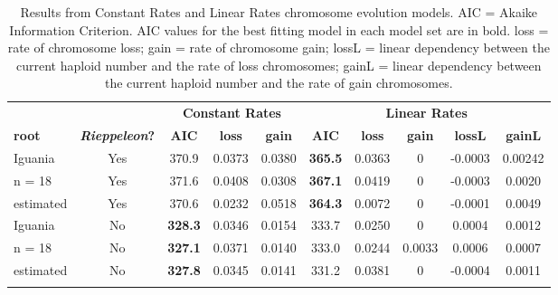 \begin{longtable}{lccccccccc}

\caption{Results from Constant Rates and Linear Rates chromosome evolution models. AIC = Akaike Information Criterion. AIC values for the best fitting model in each model set are in bold. loss = rate of chromosome loss; gain = rate of chromosome gain; lossL = linear dependency between the current haploid number and the rate of loss chromosomes; gainL = linear dependency between the current haploid number and the rate of gain chromosomes.}\\ 
  
\hline
 &  & \multicolumn{3}{c}{\textbf{Constant Rates}} & \multicolumn{5}{c}{\textbf{Linear Rates}} \\
\textbf{root} & \textbf{\textit{Rieppeleon}?} & 
\textbf{AIC} & \textbf{loss} & \textbf{gain} & 
\textbf{AIC} & \textbf{loss} & \textbf{gain} & \textbf{lossL} & \textbf{gainL} \\
\hline
Iguania  &
Yes &
370.9 &
0.0373 &
0.0380 &
\textbf{365.5} &
0.0363 &
0 &
-0.0003 &
0.00242 \\
n = 18  &
Yes &
371.6 &
0.0408 &
0.0308 &
\textbf{367.1} &
0.0419 &
0 &
-0.0003 &
0.0020 \\
estimated &
Yes &
370.6 &
0.0232 &
0.0518 &
\textbf{364.3} &
0.0072 &
0 &
-0.0001 &
0.0049 \\
Iguania &
No &
\textbf{328.3} &
0.0346 &
0.0154 &
333.7 &
0.0250 &
0 &
0.0004 &
0.0012 \\
n = 18 &
No &
\textbf{327.1} &
0.0371 &
0.0140 &
333.0 &
0.0244 &
0.0033 &
0.0006 &
0.0007 \\
estimated &
No &
\textbf{327.8} &
0.0345 &
0.0141 &
331.2 &
0.0381 &
0 &
-0.0004 &
0.0011\\
\hline

\label{table-otus}
\end{longtable}
